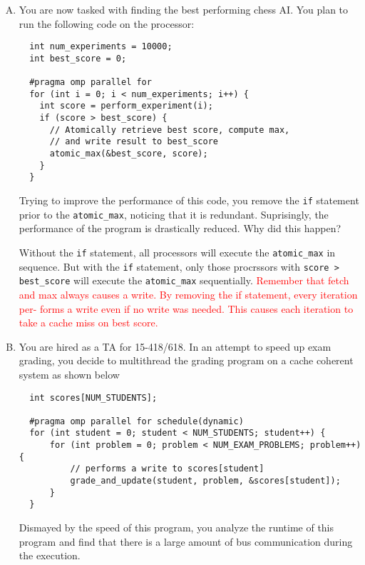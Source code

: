 \documentclass[11pt]{article}
\newenvironment{choice}{\begin{enumerate}[A.]}{\end{enumerate}}
\newenvironment{answer}{\begin{minipage}[c][1.5in]{\textwidth}}{\end{minipage}}
\begin{document}
\begin{choice}
\begin{answer}
  \textcolor{cyan}{
    The cache coherence is controlled by cache controller, not processor. So the heavy communication
    on a singal node won't affect program speed significantly. 
  }
\end{answer}

\newpage
\item 
  You are now tasked with finding the best performing chess AI. You plan to run the following code on the
  processor:
  \begin{lstlisting}
  int num_experiments = 10000;
  int best_score = 0;

  #pragma omp parallel for 
  for (int i = 0; i < num_experiments; i++) {
    int score = perform_experiment(i);
    if (score > best_score) {
      // Atomically retrieve best score, compute max,
      // and write result to best_score
      atomic_max(&best_score, score);
    }
  }
  \end{lstlisting}
  Trying to improve the performance of this code, you remove the \texttt{if} statement prior to the \verb|atomic_max|,
  noticing that it is redundant. Suprisingly, the performance of the program is drastically reduced. Why did
  this happen?

\begin{answer}
  Without the \lstinline{if} statement, all processors will execute the \lstinline{atomic_max} in
  sequence. But with the \lstinline{if} statement, only those procrssors with \lstinline{score > best_score} 
  will execute the \lstinline{atomic_max} sequentially. 
  \textcolor{red}{
    Remember that fetch and max always causes a write. By removing the if statement, every 
    iteration per- forms a write even if no write was needed. This causes each iteration to take 
    a cache miss on best score.
  }
\end{answer}

\newpage
\item 
  You are hired as a TA for 15-418/618.  In an attempt to speed up
  exam grading, you decide to multithread the grading
  program on a cache coherent system as shown below
  \begin{lstlisting}
  int scores[NUM_STUDENTS];

  #pragma omp parallel for schedule(dynamic)
  for (int student = 0; student < NUM_STUDENTS; student++) {
      for (int problem = 0; problem < NUM_EXAM_PROBLEMS; problem++) {
          // performs a write to scores[student] 
          grade_and_update(student, problem, &scores[student]); 
      }
  }
  \end{lstlisting}
  Dismayed by the speed of this program, you analyze the runtime of this program and find that there
  is a large amount of bus communication during the execution.


\end{choice}
\end{document}
